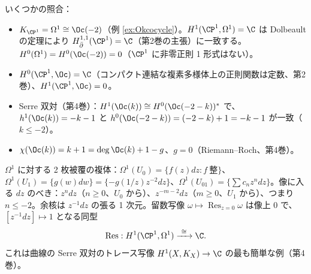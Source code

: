 いくつかの照合：
\begin{itemize}
\item $K_{\CP^1}=\Omega^1\cong\Oc(-2)$（例 \ref{ex:Okcocycle}）。$H^1(\CP^1,\Omega^1)=\C$ は Dolbeault の定理により $H^{1,1}_{\bar\partial}(\CP^1)=\C$（第2巻の主張）に一致する。$H^0(\Omega^1)=H^0(\Oc(-2))=0$（$\CP^1$ に非零正則 1 形式はない）。
\item $H^0(\CP^1,\Oc)=\C$（コンパクト連結な複素多様体上の正則関数は定数、第2巻）、$H^1(\CP^1,\Oc)=0$。
\item Serre 双対（第4巻）：$H^1(\Oc(k))\cong H^0(\Oc(-2-k))^*$ で、$h^1(\Oc(k))=-k-1$ と $h^0(\Oc(-2-k))=(-2-k)+1=-k-1$ が一致（$k\le-2$）。
\item $\chi(\Oc(k))=k+1=\deg\Oc(k)+1-g$、$g=0$（Riemann--Roch、第4巻）。
\end{itemize}
\begin{ex}\label{ex:residue}\tP
$\Omega^1$ に対する 2 枚被覆の複体：$\Omega^1(U_0)=\{f(z)dz:f\ \text{整}\}$、$\Omega^1(U_1)=\{g(w)dw\}=\{-g(1/z)z^{-2}dz\}$、$\Omega^1(U_{01})=\{\sum c_nz^ndz\}$。像に入る $dz$ のべき：$z^ndz$（$n\ge0$、$U_0$ から）、$z^{-m-2}dz$（$m\ge0$、$U_1$ から）、つまり $n\le-2$。余核は $z^{-1}dz$ の張る 1 次元。留数写像 $\omega\mapsto\operatorname{Res}_{z=0}\omega$ は像上 $0$ で、$[z^{-1}dz]\mapsto1$ となる同型
\[
\operatorname{Res}:H^1(\CP^1,\Omega^1)\xrightarrow{\ \cong\ }\C.
\]
これは曲線の Serre 双対のトレース写像 $H^1(X,K_X)\to\C$ の最も簡単な例（第4巻）。
\end{ex}
